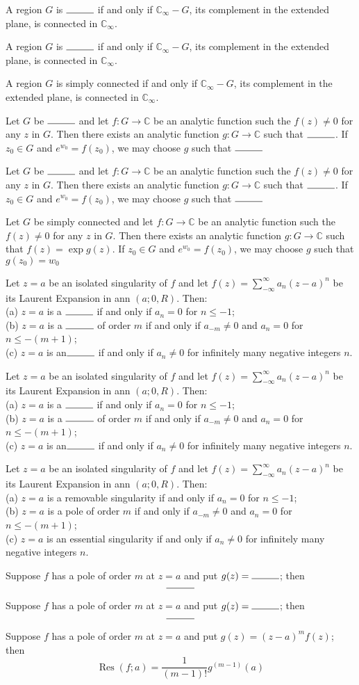 \documentclass[17pt]{extarticle}
\newcommand{\boxset}[2]{\begin{mdframed}[style=darkQuesion]
#1
\end{mdframed}
\newpage
\begin{mdframed}[style=darkQuesion]
  #1
    \end{mdframed}
\begin{mdframed}[style=darkAnswer]
  #2
    \end{mdframed}
    \newpage
}
\begin{document}
\boxset{
  A region $G$ is $\rule{1cm}{0.15mm}$ if and only if $\mathbb{C}_{\infty}-G$, its complement in the extended plane, is connected in $\mathbb{C}_{\infty}$.
}
{A region $G$ is simply connected if and only if $\mathbb{C}_{\infty}-G$, its complement in the extended plane, is connected in $\mathbb{C}_{\infty}$.}
\boxset{
  Let $G$ be $\rule{1cm}{0.15mm}$ and let $f: G \rightarrow \mathbb{C}$ be an analytic function such the $f(z) \neq 0$ for any $z$ in $G$. Then there exists an analytic function $g: G \rightarrow \mathbb{C}$ such that $\rule{1cm}{0.15mm}$. If $z_{0} \in G$ and $e^{w_{0}}=f\left(z_{0}\right)$, we may choose $g$ such that $\rule{1cm}{0.15mm}$
 }
{
  Let $G$ be simply connected and let $f: G \rightarrow \mathbb{C}$ be an analytic function such the $f(z) \neq 0$ for any $z$ in $G$. Then there exists an analytic function $g: G \rightarrow \mathbb{C}$ such that $f(z)=\exp g(z)$. If $z_{0} \in G$ and $e^{w_{0}}=f\left(z_{0}\right)$, we may choose $g$ such that $g\left(z_{0}\right)=w_{0}$
}
\boxset{Let $z=a$ be an isolated singularity of $f$ and let $f(z)=\sum_{-\infty}^{\infty} a_{n}(z-a)^{n}$ be its Laurent Expansion in ann $(a ; 0, R)$. Then:\\
(a) $z=a$ is a $\rule{1cm}{0.15mm}$ if and only if $a_{n}=0$ for $n \leq-1$;\\
(b) $z=a$ is a $\rule{1cm}{0.15mm}$ of order $m$ if and only if $a_{-m} \neq 0$ and $a_{n}=0$ for $n \leq-(m+1)$;\\
(c) $z=a$ is an$\rule{1cm}{0.15mm}$ if and only if $a_{n} \neq 0$ for infinitely many negative integers $n$.}
{Let $z=a$ be an isolated singularity of $f$ and let $f(z)=\sum_{-\infty}^{\infty} a_{n}(z-a)^{n}$ be its Laurent Expansion in ann $(a ; 0, R)$. Then:\\
(a) $z=a$ is a removable singularity if and only if $a_{n}=0$ for $n \leq-1$;\\
(b) $z=a$ is a pole of order $m$ if and only if $a_{-m} \neq 0$ and $a_{n}=0$ for $n \leq-(m+1)$;\\
(c) $z=a$ is an essential singularity if and only if $a_{n} \neq 0$ for infinitely many negative integers $n$.}
\boxset{Suppose $f$ has a pole of order $m$ at $z=a$ and put $g(z)=\rule{1cm}{0.15mm}$; then
\[\rule{1cm}{0.15mm}\]}{
  Suppose $f$ has a pole of order $m$ at $z=a$ and put $g(z)=(z-a)^{m} f(z)$; then
\[\operatorname{Res}(f ; a)=\frac{1}{(m-1) !} g^{(m-1)}(a)\]
}
\end{document}

